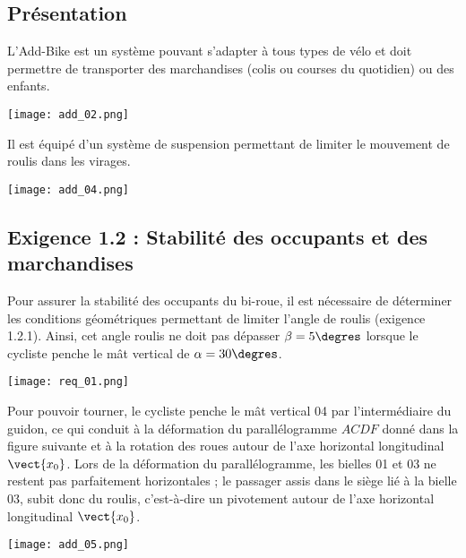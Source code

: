 \begin{multicols}{2}

\subsection*{Présentation}
L'Add-Bike est un système pouvant s’adapter à tous types de vélo et doit permettre de transporter des marchandises (colis ou courses du quotidien) ou des enfants.
\begin{center}
\texttt{[image: add\_02.png]}
\end{center}
Il est équipé d'un système de suspension permettant de limiter le mouvement de roulis dans les virages. 

\begin{center}
\texttt{[image: add\_04.png]}
\end{center}

\subsection*{Exigence 1.2 : Stabilité des occupants et des marchandises}

\begin{obj}
Pour assurer la stabilité des occupants du bi-roue, il est nécessaire de déterminer les conditions géométriques permettant de limiter l’angle de roulis (exigence 1.2.1). Ainsi, cet angle roulis ne doit pas dépasser $\beta=5\degres$  lorsque le cycliste  penche le mât vertical de $\alpha=30\degres$.
\end{obj}

\begin{center}
\texttt{[image: req\_01.png]}
\end{center}
Pour pouvoir tourner, le cycliste penche le mât vertical 04 par l’intermédiaire du guidon, ce qui conduit à la déformation du parallélogramme $ACDF$ donné dans la figure suivante et à la rotation des roues autour de l’axe horizontal longitudinal
$\vect{x_0}$. Lors de la déformation du parallélogramme, les bielles 01 et 03 ne restent pas parfaitement horizontales ; le passager assis dans le siège lié à la bielle 03, subit donc du roulis, c’est-à-dire un pivotement autour de l’axe horizontal longitudinal $\vect{x_0}$.

\begin{center}
\texttt{[image: add\_05.png]}
\end{center}


\end{multicols}
